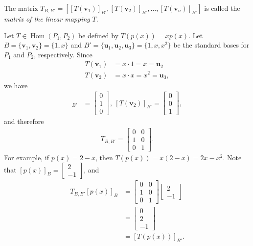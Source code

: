 \documentclass[12pt,letterpaper,reqno]{article}
\numberwithin{equation}{section}
\newcommand{\bv}{\mathbf{v}}
\newcommand{\bu}{\mathbf{u}}
\DeclareMathOperator{\Hom}{Hom}
\begin{document}
\begin{defn}
	The matrix $T_{B,B'}=[[T(\bv_1)]_{B'}, [T(\bv_2)]_{B'},\dots, [T(\bv_n)]_{B'}]$ is called the \emph{matrix of the linear mapping} $T$.
\end{defn}

\begin{example}
Let $T \in \Hom(P_1,P_2)$ be defined by $T(p(x))=xp(x)$. Let $B=\{\bv_1,\bv_2\}=\{1,x\}$ and $B'=\{\bu_1,\bu_2,\bu_3\}=\{1,x,x^2\}$ be the standard bases for $P_1$ and $P_2$, respectively. Since
\begin{align*}
	T(\bv_1)&=x\cdot 1=x=\bu_2 \\
	T(\bv_2)&=x \cdot x=x^2=\bu_3,
\end{align*}	
we have 
\begin{align*}
	[T(\bv_1)]_{B'}&=\begin{bmatrix}
		0 \\ 1 \\ 0
	\end{bmatrix}, \ 
	[T(\bv_2)]_{B'}=\begin{bmatrix}
		0 \\ 0 \\ 1
	\end{bmatrix},
\end{align*}
and therefore
\begin{align*}
	T_{B,B'}=\begin{bmatrix}
		0 & 0 \\ 1 & 0 \\ 0 & 1
	\end{bmatrix}.
\end{align*}
For example, if $p(x)=2-x$, then $T(p(x))=x(2-x)=2x-x^2$. Note that $[p(x)]_B=\begin{bmatrix}
	2 \\ -1
\end{bmatrix}$, and 
\begin{align*}
	T_{B,B'}[p(x)]_B&=\begin{bmatrix}
		0 & 0 \\ 1 & 0 \\ 0 & 1
	\end{bmatrix}\begin{bmatrix}
	2 \\ -1
\end{bmatrix} \\
&=\begin{bmatrix}
	0 \\ 2 \\ -1
\end{bmatrix} \\
&=[T(p(x))]_{B'}.
\end{align*}
\end{example}
\end{document}
